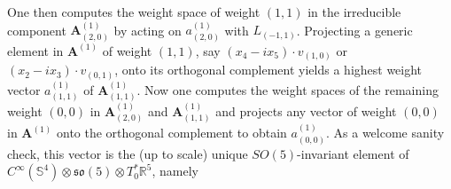 \documentclass[11pt,reqno]{amsart}
\theoremstyle{remark}
\theoremstyle{definition}
\newcommand{\sov}{\mathfrak{so}(5)}
\begin{document}
\vspace{1mm}
\vspace{1mm} \newline

One then computes the weight space of weight $(1,1)$ in the irreducible component $\mathbf A^{(1)}_{(2,0)}$ by acting on $a^{(1)}_{(2,0)}$ with $L_{(-1,1)}$. Projecting a generic element in $\mathbf A^{(1)}$ of weight $(1,1)$, say $(x_4 - i x_5) \cdot v_{(1,0)}$ or $(x_2 - i x_3) \cdot v_{(0,1)}$, onto its orthogonal complement yields a highest weight vector $a^{(1)}_{(1,1)}$ of $\mathbf A^{(1)}_{(1,1)}$. Now one computes the weight spaces of the remaining weight $(0,0)$ in $\mathbf A^{(1)}_{(2,0)}$ and $\mathbf A^{(1)}_{(1,1)}$ and projects any vector of weight $(0,0)$ in $\mathbf A^{(1)}$ onto the orthogonal complement to obtain $a^{(1)}_{(0,0)}$. As a welcome sanity check, this vector is the (up to scale) unique $SO(5)$-invariant element of $C^\infty(\mathbb S^4) \otimes \sov \otimes T_0^\ast \mathbb R^5$, namely 
\end{document}

